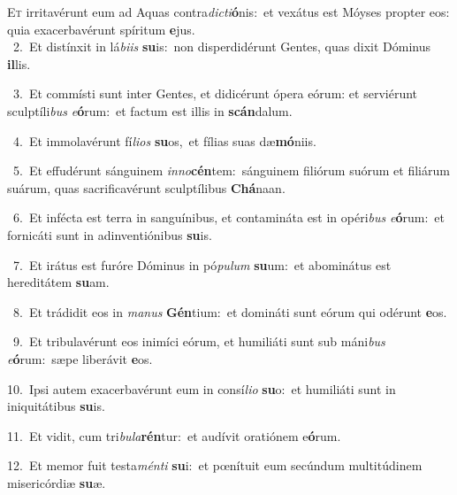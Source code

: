 \lettrine{\initial\textcolor{\initialcolor}{E}}{t} irritavérunt eum ad Aquas contra\-\textit{dic}\-\textit{ti}\textbf{ó}nis:~\star et vexátus est Móyses propter eos: quia exacerbavérunt spíritum \textbf{e}\-jus.\\
{\numbfont\textcolor{\numbcolor}{~2.}}~Et distínxit in lá\-\textit{bi}\-\textit{is} \textbf{su}\-is:~\star non disperdidérunt Gentes, quas dixit Dóminus \textbf{il}\-lis.\par
{\numbfont\textcolor{\numbcolor}{~3.}}~Et commísti sunt inter Gentes, et didicérunt ópera eórum: et serviérunt sculptíli\textit{bus} \textit{e}\-\textbf{ó}rum:~\star et factum est illis in \textbf{scán}\-dalum.\par
{\numbfont\textcolor{\numbcolor}{~4.}}~Et immolavérunt fí\-\textit{li}\-\textit{os} \textbf{su}\-os,~\star et fílias suas dæ\-\textbf{mó}\-niis.\par
{\numbfont\textcolor{\numbcolor}{~5.}}~Et effudérunt sánguinem \textit{in}\-\textit{no}\textbf{cén}tem:~\star sánguinem filiórum suórum et filiárum suárum, quas sacrificavérunt sculptílibus \textbf{Chá}\-naan.\par
{\numbfont\textcolor{\numbcolor}{~6.}}~Et infécta est terra in sanguínibus, et contamináta est in opéri\textit{bus} \textit{e}\-\textbf{ó}rum:~\star et fornicáti sunt in adinventiónibus \textbf{su}\-is.\par
{\numbfont\textcolor{\numbcolor}{~7.}}~Et irátus est furóre Dóminus in pó\-\textit{pu}\-\textit{lum} \textbf{su}\-um:~\star et abominátus est hereditátem \textbf{su}\-am.\par
{\numbfont\textcolor{\numbcolor}{~8.}}~Et trádidit eos in \textit{ma}\-\textit{nus} \textbf{Gén}\-tium:~\star et domináti sunt eórum qui odérunt \textbf{e}\-os.\par
{\numbfont\textcolor{\numbcolor}{~9.}}~Et tribulavérunt eos inimíci eórum, et humiliáti sunt sub máni\textit{bus} \textit{e}\-\textbf{ó}rum:~\star sæpe liberávit \textbf{e}\-os.\par
{\numbfont\textcolor{\numbcolor}{10.}}~Ipsi autem exacerbavérunt eum in consí\-\textit{li}\-\textit{o} \textbf{su}\-o:~\star et humiliáti sunt in iniquitátibus \textbf{su}\-is.\par
{\numbfont\textcolor{\numbcolor}{11.}}~Et vidit, cum tri\-\textit{bu}\-\textit{la}\textbf{rén}tur:~\star et audívit oratiónem e\-\textbf{ó}\-rum.\par
{\numbfont\textcolor{\numbcolor}{12.}}~Et memor fuit testa\-\textit{mén}\-\textit{ti} \textbf{su}\-i:~\star et pœnítuit eum secúndum multitúdinem misericórdiæ \textbf{su}\-æ.\par
